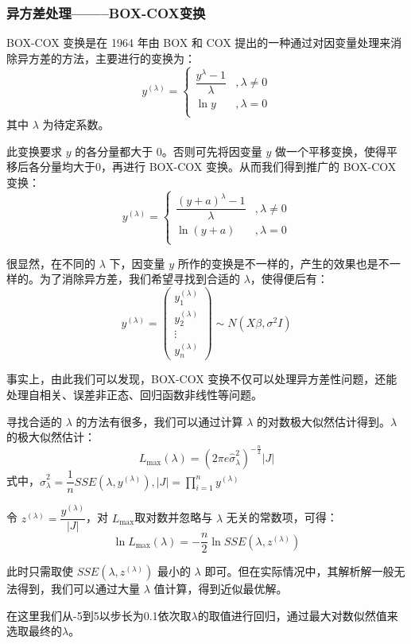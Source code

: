 \documentclass[11pt]{article}
\begin{document}
\subsubsection*{异方差处理--------BOX-COX变换}
BOX-COX 变换是在 1964 年由 BOX 和 COX 提出的一种通过对因变量处理来消除异方差的方法，主要进行的变换为：
$$
y^{(\lambda)}=\left\{\begin{array}{cl}
	\dfrac{y^\lambda-1}{\lambda}&,\lambda\ne 0\\
	\ln y&,\lambda=0\\
\end{array}\right.
$$
其中 $\lambda$ 为待定系数。

此变换要求 $y$ 的各分量都大于 0。否则可先将因变量 $y$ 做一个平移变换，使得平移后各分量均大于0，再进行 BOX-COX 变换。从而我们得到推广的 BOX-COX 变换：
$$
y^{(\lambda)}=\left\{\begin{array}{cl}
	\dfrac{(y+a)^\lambda-1}{\lambda}&,\lambda\ne 0\\
	\ln (y+a)&,\lambda=0\\
\end{array}\right.
$$

很显然，在不同的 $\lambda$ 下，因变量 $y$ 所作的变换是不一样的，产生的效果也是不一样的。为了消除异方差，我们希望寻找到合适的 $\lambda$，使得便后有：
$$
y^{(\lambda)}=\begin{pmatrix}
	y_1^{(\lambda)}\\
	y_2^{(\lambda)}\\
	\vdots\\
	y_n^{(\lambda)}
\end{pmatrix}\sim N(X\beta,\sigma^2I)
$$

事实上，由此我们可以发现，BOX-COX 变换不仅可以处理异方差性问题，还能处理自相关、误差非正态、回归函数非线性等问题。

寻找合适的 $\lambda$ 的方法有很多，我们可以通过计算 $\lambda$ 的对数极大似然估计得到。$\lambda$ 的极大似然估计：
$$
L_{\max}(\lambda)=(2\pi e\hat{\sigma}_\lambda^2)^{-\frac{n}{2}}|J|
$$
式中，$\hat{\sigma}^2_\lambda=\dfrac{1}{n}SSE(\lambda,y^{(\lambda)}),|J|=\prod\limits_{i=1}^ny^{(\lambda)}$

令 $z^{(\lambda)}=\dfrac{y^{(\lambda)}}{|J|}$，对 $L_{\max}$取对数并忽略与 $\lambda$ 无关的常数项，可得：
$$
\ln L_{\max}(\lambda)=-\dfrac{n}{2}\ln SSE(\lambda,z^{(\lambda)})
$$

此时只需取使 $SSE(\lambda,z^{(\lambda)})$ 最小的 $\lambda$ 即可。但在实际情况中，其解析解一般无法得到，我们可以通过大量 $\lambda$ 值计算，得到近似最优解。

在这里我们从-5到5以步长为0.1依次取$\lambda$的取值进行回归，通过最大对数似然值来选取最终的$\lambda$。
\end{document}
